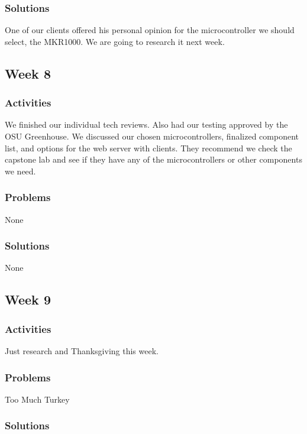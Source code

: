 \documentclass[IEEEtran,letterpaper,10pt,titlepage,fleqn,draftclsnofoot,onecolumn]{article}
\begin{document}
\subsubsection{Solutions}

One of our clients offered his personal opinion for the microcontroller we should select, the MKR1000. We are going to research it next week. 

\subsection{Week 8}
\subsubsection{Activities}

We finished our individual tech reviews. Also had our testing approved by the OSU Greenhouse. We discussed our chosen microcontrollers, finalized component list, and options for the web server with clients. They recommend we check the capstone lab and see if they have any of the microcontrollers or other components we need. 

\subsubsection{Problems}

None

\subsubsection{Solutions}

None

\subsection{Week 9}
\subsubsection{Activities}

Just research and Thanksgiving this week. 

\subsubsection{Problems}

Too Much Turkey

\subsubsection{Solutions}
\end{document}

